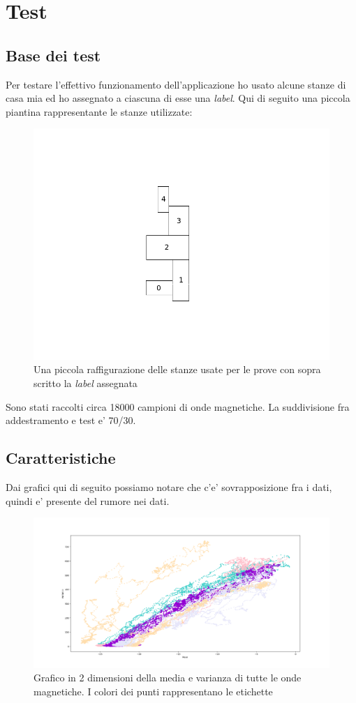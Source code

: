 \chapter{Test}

\section{Base dei test}
Per testare l'effettivo funzionamento dell'applicazione ho usato alcune stanze di casa mia ed ho assegnato a ciascuna di esse una \textit{label}. Qui di seguito una piccola piantina rappresentante le stanze utilizzate:

\begin{figure}[H]
\centering
\includegraphics[width=0.7\linewidth]{img/test_pianta_casa}
\caption{Una piccola raffigurazione delle stanze usate per le prove con sopra scritto la \textit{label} assegnata}
\label{fig:test_pianta_casa}
\end{figure}

Sono stati raccolti circa 18000 campioni di onde magnetiche. La suddivisione fra addestramento e test e' 70/30.

\section{Caratteristiche}
Dai grafici qui di seguito possiamo notare che c'e' sovrapposizione fra i dati, quindi e' presente del rumore nei dati.
\begin{figure}[H]
	\centering
	\includegraphics[width=1\linewidth]{img/plot_features}
	\caption{Grafico in 2 dimensioni della media e varianza di tutte le onde magnetiche. I colori dei punti rappresentano le etichette}
	\label{fig:plotfeatures}
\end{figure}

